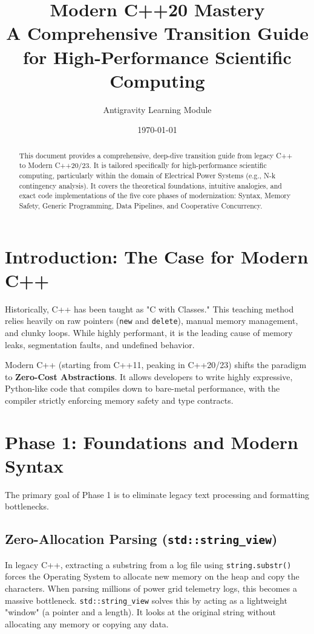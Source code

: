 \documentclass[11pt,a4paper]{article}
\title{\textbf{Modern C++20 Mastery}\\ \Large A Comprehensive Transition Guide for High-Performance Scientific Computing}
\author{Antigravity Learning Module}
\date{\today}
\begin{document}
\maketitle

\begin{abstract}
This document provides a comprehensive, deep-dive transition guide from legacy C++ to Modern C++20/23. It is tailored specifically for high-performance scientific computing, particularly within the domain of Electrical Power Systems (e.g., N-k contingency analysis). It covers the theoretical foundations, intuitive analogies, and exact code implementations of the five core phases of modernization: Syntax, Memory Safety, Generic Programming, Data Pipelines, and Cooperative Concurrency.
\end{abstract}

\tableofcontents
\newpage

\section{Introduction: The Case for Modern C++}
Historically, C++ has been taught as "C with Classes." This teaching method relies heavily on raw pointers (\texttt{new} and \texttt{delete}), manual memory management, and clunky loops. While highly performant, it is the leading cause of memory leaks, segmentation faults, and undefined behavior.

Modern C++ (starting from C++11, peaking in C++20/23) shifts the paradigm to \textbf{Zero-Cost Abstractions}. It allows developers to write highly expressive, Python-like code that compiles down to bare-metal performance, with the compiler strictly enforcing memory safety and type contracts.

\section{Phase 1: Foundations and Modern Syntax}
The primary goal of Phase 1 is to eliminate legacy text processing and formatting bottlenecks.

\subsection{Zero-Allocation Parsing (\texttt{std::string\_view})}
In legacy C++, extracting a substring from a log file using \texttt{string.substr()} forces the Operating System to allocate new memory on the heap and copy the characters. When parsing millions of power grid telemetry logs, this becomes a massive bottleneck.
\texttt{std::string\_view} solves this by acting as a lightweight "window" (a pointer and a length). It looks at the original string without allocating any memory or copying any data.
\end{document}
